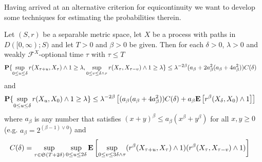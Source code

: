 Having arrived at an alternative criterion for equicontinuity we want to develop some techniques for estimating the probabilities therein.
\begin{lem}Let $(S,r)$ be a separable metric space, let $X$ be a process with paths in $D([0,\infty); S)$ and let $T >0$ and $\beta > 0$ be given.  Then for each $\delta >0$,
$\lambda >0$ and weakly $\mathcal{F}^X$-optional time $\tau$ with $\tau \leq T$
\begin{align*}
\textbf{P}\{\sup_{0 \leq u \leq \delta} r(X_{\tau + u}, X_\tau) \wedge 1 \geq \lambda, \sup_{0 \leq v \leq \delta \wedge \tau} r(X_{\tau}, X_{\tau-v}) \wedge 1 \geq \lambda\} &\leq \lambda^{-2\beta} (a_\beta + 2 a_\beta^2 (a_\beta + 4 a_\beta^2))C(\delta)
\end{align*}
and 
\begin{align*}
\textbf{P}\{\sup_{0 \leq u \leq \delta} r(X_{u}, X_0) \wedge 1 \geq \lambda\} &\leq \lambda^{-2\beta} \left [ ( a_\beta (a_\beta + 4 a_\beta^2))C(\delta) + 
a_\beta \textbf{E}\left[r^\beta(X_{\delta}, X_0) \wedge 1\right] \right]
\end{align*}
where $a_\beta$ is any number that satisfies $(x+y)^\beta \leq a_\beta(x^\beta + y^\beta)$ for all $x,y \geq0$ (e.g. $a_\beta = 2^{(\beta-1) \vee 0}$) and 
\begin{align*}
C(\delta) &= \sup_{\tau \in \mathfrak{S}(T + 2 \delta)} \sup_{0 \leq u \leq 2\delta} 
\textbf{E}\left[\sup_{0 \leq v \leq 3\delta \wedge \tau} (r^\beta(X_{\tau+u}, X_\tau) \wedge 1) (r^\beta(X_{\tau}, X_{\tau-v}) \wedge 1)\right]
\end{align*}
\end{lem}
